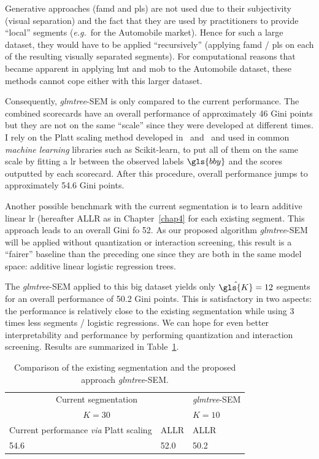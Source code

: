 Generative approaches (\gls{famd} and \gls{pls}) are not used due to their subjectivity (visual separation) and the fact that they are used by practitioners to provide ``local'' segments (\textit{e.g.}\ for the Automobile market). Hence for such a large dataset, they would have to be applied ``recursively'' (applying \gls{famd} / \gls{pls} on each of the resulting visually separated segments). For computational reasons that became apparent in applying \gls{lmt} and \gls{mob} to the Automobile dataset, these methods cannot cope either with this larger dataset.

Consequently, \textit{glmtree}-SEM is only compared to the current performance. The combined scorecards have an overall performance of approximately 46 Gini points but they are not on the same ``scale'' since they were developed at different times. I rely on the Platt scaling method developed in~\cite{platt1999probabilistic} and~\cite{zadrozny2002transforming} and used in common \textit{machine learning} libraries such as Scikit-learn, to put all of them on the same scale by fitting a \gls{lr} between the observed labels $\gls{bby}$ and the scores outputted by each scorecard. After this procedure, overall performance jumps to approximately 54.6 Gini points.

Another possible benchmark with the current segmentation is to learn additive linear \gls{lr} (hereafter ALLR as in Chapter~\ref{chap4} for each existing segment. This approach leads to an overall Gini fo 52. As our proposed algorithm \textit{glmtree}-SEM will be applied without quantization or interaction screening, this result is a ``fairer'' baseline than the preceding one since they are both in the same model space: additive linear logistic regression trees.

The \textit{glmtree}-SEM applied to this big dataset yields only $\hat{\gls{K}} = 12$ segments for an overall performance of 50.2 Gini points. This is satisfactory in two aspects: the performance is relatively close to the existing segmentation while using 3 times less segments / logistic regressions. We can hope for even better interpretability and performance by performing quantization and interaction screening. Results are summarized in Table~\ref{tab:res_tot_trees}.

\begin{table}[t]
\caption{\label{tab:res_tot_trees} Comparison of the existing segmentation and the proposed approach \textit{glmtree}-SEM.}
\centering
\begin{tabular}{l|l|l}
\multicolumn{2}{c|}{Current segmentation} & \textit{glmtree}-SEM \\
\multicolumn{2}{c|}{$K = 30$} & $K = 10$ \\
\hline
Current performance \textit{via} Platt scaling & ALLR & ALLR \\
\hline
54.6 & 52.0 & 50.2 \\
\end{tabular}
\end{table}

